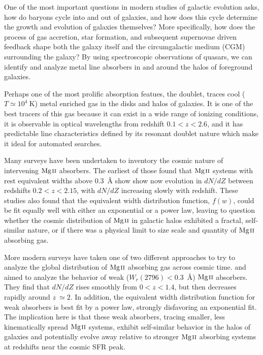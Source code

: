 \documentclass[iop,apj,numberedappendix,appendixfloats,twocolappendix]{emulateapj}
\begin{document}
One of the most important questions in modern studies of galactic evolution asks, how do baryons cycle into and out of galaxies, and how does this cycle determine the growth and evolution of galaxies themselves? More specifically, how does the process of gas accretion, star formation, and subsequent supernovae driven feedback shape both the galaxy itself and the circumgalactic medium (CGM) surrounding the galaxy? By using spectroscopic observations of quasars, we can identify and analyze metal line absorbers in and around the halos of foreground galaxies. 

Perhaps one of the most prolific absorption featues, the {\MgIIdblt} doublet, traces cool ($T \simeq 10^4~\mathrm{K}$) metal enriched gas in the disks and halos of galaxies. It is one of the best tracers of this gas because it can exist in a wide range of ionizing conditions, it is observable in optical wavelengths from redshift $0.1 < z < 2.6$, and it has predictable line characteristics defined by its resonant doublet nature which make it ideal for automated searches. 

Many surveys have been undertaken to inventory the cosmic nature of intervening ${\hbox{{\rm Mg}\kern 0.1em{\sc ii}}}$ absorbers. The earliest of those \citep{Lanzetta1987,Tytler1987,Sargent1988,Steidel1992} found that ${\hbox{{\rm Mg}\kern 0.1em{\sc ii}}}$ systems with rest equivalent widths above $0.3$~{\AA} show show now evolution in $dN\!/dZ$ between redshifts $0.2 < z < 2.15$, with $dN\!/dZ$ increasing slowly with redshift. These studies also found that the equivalent width distribution function, $f(w)$, could be fit equally well with either an exponential or a power law, leaving to question whether the cosmic distribution of ${\hbox{{\rm Mg}\kern 0.1em{\sc ii}}}$ in galactic halos exhibited a fractal, self-similar nature, or if there was a physical limit to size scale and quantity of ${\hbox{{\rm Mg}\kern 0.1em{\sc ii}}}$ absorbing gas. 

More modern surveys have taken one of two different approaches to try to analyze the global distribution of ${\hbox{{\rm Mg}\kern 0.1em{\sc ii}}}$ absorbing gas across cosmic time. \cite{Churchill1999} and \cite{Narayanan2007} aimed to analyze the behavior of weak ($W_r(2796) < 0.3$~{\AA}) ${\hbox{{\rm Mg}\kern 0.1em{\sc ii}}}$ absorbers. They find that $dN\!/dZ$ rises smoothly from $0 < z < 1.4$, but then decreases rapidly around $z~\simeq 2$. In addition, the equivalent width distribution function for weak absorbers is best fit by a power law, strongly disfavoring an exponential fit. The implication here is that these weak absorbers, tracing smaller, less kinematically spread ${\hbox{{\rm Mg}\kern 0.1em{\sc ii}}}$ systems, exhibit self-similar behavior in the halos of galaxies and potentially evolve away relative to stronger ${\hbox{{\rm Mg}\kern 0.1em{\sc ii}}}$ absorbing systems at redshifts near the cosmic SFR peak. 
\end{document}
